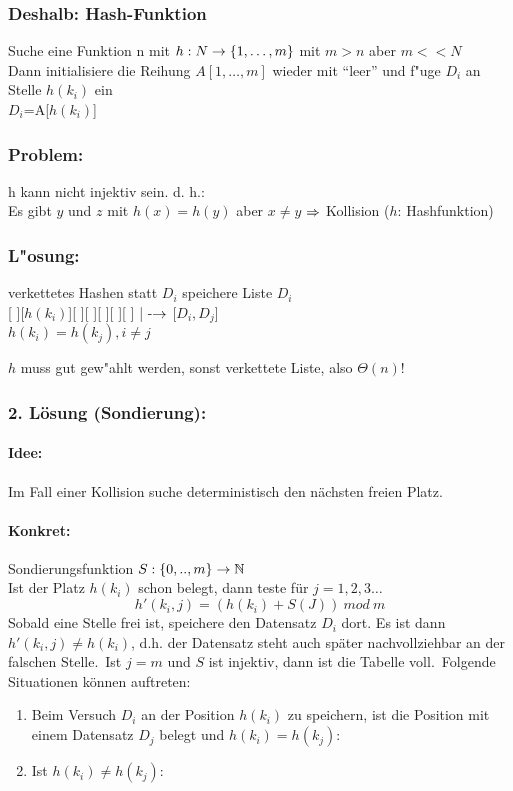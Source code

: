 \documentclass[a4paper,twoside,DIV15,BCOR12mm]{scrbook}
\begin{document}
		\subsubsection*{Deshalb: Hash-Funktion}		
		Suche eine Funktion n mit $h:N\rightarrow\{1,\dots,m\}$ mit $m>n$ aber $m<<N$\\
		Dann initialisiere die Reihung $A[1,\dots,m]$ wieder mit "`leer"' und f"uge $D_i$ an Stelle $h(k_i)$ ein \\
		$D_i$=A[$h(k_i)$]
		
		\subsubsection*{Problem:} 
		h kann nicht injektiv sein. d. h.:\\
		Es gibt $y$ und $z$ mit $h(x) = h(y)$ aber $x \ne y$ $\Rightarrow$ Kollision ($h$: Hashfunktion)\\
		\subsubsection*{L"osung:}
		verkettetes Hashen
		statt $D_i$ speichere Liste $D_i$\\
		[ ][$h(k_i)$][ ][ ][ ][ ][ ]
			|
			-$\rightarrow$ [$D_i,D_j$]\\
	$h(k_i)=h(k_j), i \ne j$

	$h$ muss gut gew"ahlt werden, sonst verkettete Liste, also $\Theta(n)$!


	\subsubsection*{2. Lösung (Sondierung):}
	\paragraph{Idee: } Im Fall einer Kollision suche deterministisch den nächsten freien Platz.
	\paragraph{Konkret: } Sondierungsfunktion $S: \{0,..,m\}\rightarrow \mathbb{N}$ \\
	Ist der Platz $h(k_i)$ schon belegt, dann teste für $j=1,2,3\ldots$ $$h'(k_i,j)=(h(k_i)+S(J))\ mod\ m$$
	Sobald eine Stelle frei ist, speichere den Datensatz $D_i$ dort. Es ist dann $h'(k_i,j)\ne h(k_i)$, d.h. der Datensatz steht auch später nachvollziehbar an der falschen Stelle.\
	Ist $j=m$ und $S$ ist injektiv, dann ist die Tabelle voll.\
	Folgende Situationen können auftreten:
	\begin{enumerate}
		\item Beim Versuch $D_i$ an der Position $h(k_i)$ zu speichern, ist die Position mit einem Datensatz $D_j$ belegt und $h(k_i)=h(k_j)$: 
		\item Ist $h(k_i)\ne h(k_j)$: 
	\end{enumerate}
\end{document}
